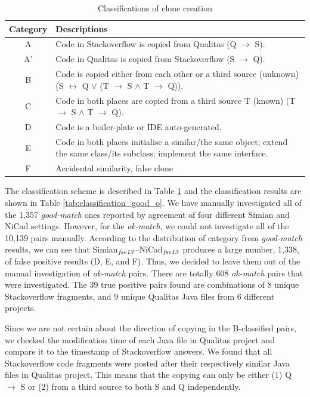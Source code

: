 \documentclass{IEEEtran}
\begin{document}
\begin{table}[H]
	\centering
	\caption{Classifications of clone creation}
	\label{tab:classification_scheme}
	\begin{tabular}{|c|p{13cm}|}
		\hline 
		Category & Descriptions \\ 
		\hline 
		A & Code in Stackoverflow is copied from Qualitas (Q $\rightarrow$ S). \\ 
		\hline 
		A' & Code in Qualitas is copied from Stackoverflow (S $\rightarrow$ Q). \\ 
		\hline 
		B & Code is copied either from each other or a third source (unknown) (S $\leftrightarrow$ Q $\vee$ (T $\rightarrow$ S $\wedge$ T $\rightarrow$ Q)).
		\\ 
		\hline 
		C & Code in both places are copied from a third source T (known) (T $\rightarrow$ S $\wedge$ T $\rightarrow$ Q).
		\\ 
		\hline 
		D & Code is a boiler-plate or IDE auto-generated.
		\\ 
		\hline 
		E & Code in both places initialise a similar/the same object; extend the same class/its subclass; implement the same interface.
		\\ 
		\hline 
		F & Accidental similarity, false clone \\ 
		\hline 
	\end{tabular} 
\end{table}

The classification scheme is described in Table \ref{tab:classification_scheme} and the classification results are shown in Table \ref{tab:classification_good_o}. We have manually investigated all of the 1,357 \textit{good-match} ones reported by agreement of four different Simian and NiCad settings.  However, for the \textit{ok-match}, we could not investigate all of the 10,139 pairs manually.  According to the distribution of category from \textit{good-match} results, we can see that Simian$_{\textrm{\textit{fse13}}}$--NiCad$_{\textrm{\textit{fse13}}}$ produces a large number, 1,338, of false positive results (D, E, and F). Thus, we decided to leave them out of the manual investigation of \textit{ok-match} pairs. There are totally 608 \textit{ok-match} pairs that were investigated. The 39 true positive pairs found are combinations of 8 unique Stackoverflow fragments, and 9 unique Qualitas Java files from 6 different projects.

Since we are not certain about the direction of copying in the B-classified pairs, we checked the modification time of each Java file in Qualitas project and compare it to the timestamp of Stackoverflow answers. We found that all Stackoverflow code fragments were posted after their respectively similar Java files in Qualitas project. This means that the copying can only be either (1) Q $\rightarrow$ S or (2) from a third source to both S and Q independently.
\end{document}
